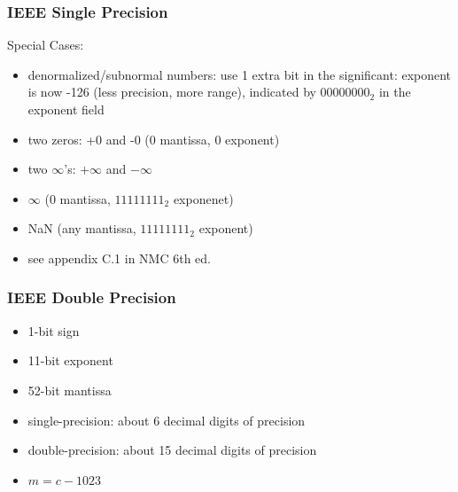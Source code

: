 \documentclass[10pt]{beamer}
\begin{document}
\begin{frame}
\frametitle{IEEE Single Precision}
Special Cases:
\begin{itemize}
  \item denormalized/subnormal numbers: use 1 extra bit in the significant:
exponent is now -126 (less precision, more range), indicated by
$00000000_2$ in the exponent field
  \item two zeros: +0 and -0 (0 mantissa, 0 exponent)
  \item two $\infty$'s: $+\infty$ and $-\infty$ 
  \item $\infty$ (0 mantissa, $11111111_2$ exponenet)
  \item NaN (any mantissa, $11111111_2$ exponent)
  \item see appendix C.1 in NMC 6th ed.
\end{itemize}
\end{frame}
\begin{frame}
\frametitle{IEEE Double Precision}
\begin{center}
\end{center}
\begin{itemize}
  \item 1-bit sign
  \item 11-bit exponent
  \item 52-bit mantissa
  \item single-precision: about 6 decimal digits of precision
  \item double-precision: about 15 decimal digits of precision
  \item $m=c-1023$
\end{itemize}
\end{frame}
\end{document}
